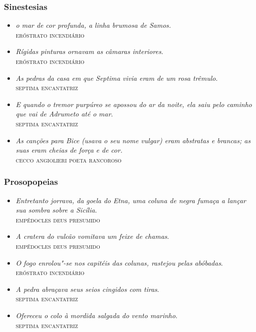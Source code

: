 \documentclass[12pt]{extarticle}
\begin{document}
\subsubsection{Sinestesias}

\begin{itemize}
\item\emph{o mar de cor profunda, a linha brumosa de Samos.}\\
\textsc{eróstrato incendiário}

\item\emph{Rígidas pinturas ornavam as câmaras interiores.}\\
\textsc{eróstrato incendiário}

\item\emph{As pedras da casa em que Septima vivia eram de um rosa
trêmulo}.\\
\textsc{septima encantatriz}

\item\emph{E quando o tremor purpúreo se apossou do ar da noite, ela saiu
pelo caminho que vai de Adrumeto até o mar}.\\
\textsc{septima encantatriz}

\item\emph{As canções para Bice (usava o seu nome vulgar) eram abstratas e
brancas; as suas eram cheias de força e de cor.}\\
\textsc{cecco angiolieri poeta rancoroso}
\end{itemize}

\subsubsection{Prosopopeias}

\begin{itemize}
\item\emph{Entretanto jorrava, da goela do Etna, uma coluna de negra fumaça
a lançar sua sombra sobre a Sicília}.\\
\textsc{empédocles deus presumido}

\item\emph{A cratera do vulcão vomitava um feixe de chamas}.\\
\textsc{empédocles deus presumido}

\item\emph{O fogo enrolou"-se nos capitéis das colunas, rastejou pelas
abóbadas}.\\
\textsc{eróstrato incendiário}

\item\emph{A pedra abraçava seus seios cingidos com tiras}.\\
\textsc{septima encantatriz}

\item\emph{Ofereceu o colo à mordida salgada do vento marinho}.\\
\textsc{septima encantatriz}

\end{itemize}
\end{document}
